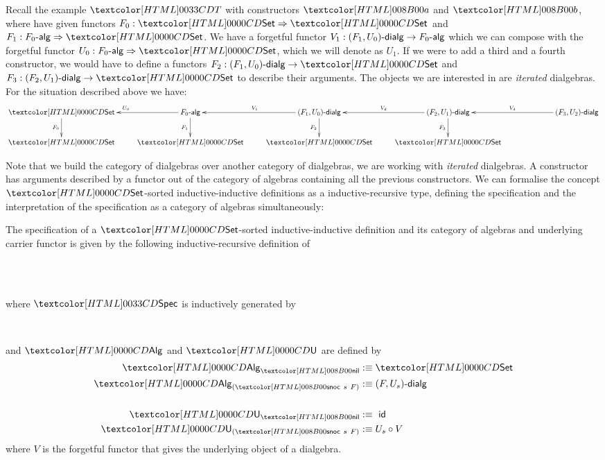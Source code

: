 Recall the example $\Tty$ with constructors $\Ta$ and $\Tb$, where
have given functors $F_0 : \Func{\Set}{\Set}$ and
$F_1 : \Func{\algcat{F_0}}{\Set}$. We have a forgetful functor
$V_1 : \dialgcat{F_1}{U_0} \to \algcat{F_0}$ which we can compose with
the forgetful functor $U_0 : \Func{\algcat{F_0}}{\Set}$, which we will
denote as $U_1$. If we were to add a third and a fourth constructor,
we would have to define a functors
$F_2 : \dialgcat{F_1}{U_0} \to \Set$ and
$F_3 : \dialgcat{F_2}{U_1} \to \Set$ to describe their arguments. The
objects we are interested in are \emph{iterated} dialgebras. For the
situation described above we have:
$$
\xymatrix@!C{
\Set 
\ar[d]_{F_0}
&\algcat{F_0} 
\ar[d]_{F_1}
\ar[l]_{U_0}
&\dialgcat{F_1}{U_0}
\ar[d]_{F_2}
\ar[l]_{V_1}
&\dialgcat{F_2}{U_1}
\ar[d]_{F_3}
\ar[l]_{V_2}
&\dialgcat{F_3}{U_2}
\ar[l]_{V_3}
\\
\Set
&\Set
&\Set
&\Set
&
}
$$

Note that we build the category of dialgebras over another category of
dialgebras, \ie we are working with \emph{iterated} dialgebras. A
constructor has arguments described by a functor out of the category
of algebras containing all the previous constructors. We can formalise
the concept $\Set$-sorted inductive-inductive definitions as a
inductive-recursive type, defining the specification and the
interpretation of the specification as a category of algebras
simultaneously:
%
\begin{definition}
  \label{type-sorted-spec}
  The specification of a $\Set$-sorted inductive-inductive definition
  and its category of algebras and underlying carrier functor is given
  by the following inductive-recursive
  definition of
  \begin{sorts}
    \sortnamety{\specty}{\Set} \\
    \functy{\Alg}{\specty \to \Cat} \\
  \end{sorts}
  where $\specty$ is inductively generated by
  \begin{datatype}{\specty}{}
    \constr{\specnil}{\specty} \\
  \end{datatype}
  and $\Alg$ and $\Und$ are defined by
  \begin{align*}
    \Alg_{\specnil} &\ddefeq \Set \\
    \Alg_{(\specsnoc\ s\ F)} &\ddefeq \dialgcat{F}{U_s} \\
    \\
    \Und_{\specnil} &\ddefeq\ \id \\
    \Und_{(\specsnoc\ s\ F)} &\ddefeq U_s \circ V
  \end{align*}
  where $V$ is the forgetful functor that gives the underlying object of
  a dialgebra.
\end{definition}

